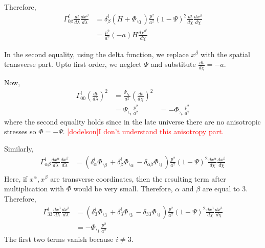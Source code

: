 \documentclass[12pt]{article}
\numberwithin{equation}{section}
\begin{document}
Therefore,
\begin{equation}
\begin{aligned}
\Gamma^{i}_{0\beta} \frac{dt}{d\lambda} \frac{dx^{\beta}}{d\lambda} & = \delta^{i}_\beta (H+\Phi,_{0})  \frac{p^2}{a^2} (1-\Psi)^2 \frac{dt}{d\chi} \frac{dx^\beta}{d\chi} \\
& = \frac{p^2}{a^2} (-a) H \frac{d\chi^{\theta^i}}{d\chi}
\label{eq:rhs1}
\end{aligned}
\end{equation}

In the second equality, using the delta function, we replace $x^\beta$ with the spatial transverse part. Upto first order, we neglect $\Psi$ and substitute $\frac{dt}{d\chi} = -a$.

Now,
\begin{equation}
\begin{aligned}
\Gamma^{i}_{00} (\frac{dt}{d\lambda})^2 & = \frac{\Psi,_{i}}{a^2} (\frac{dt}{d\chi})^2 \\
& = \Psi,_{i} \frac{p^2}{a^2}
& = -\Phi,_{i} \frac{p^2}{a^2}
\label{eq:rhs2}
\end{aligned}
\end{equation}
where the second equality holds since in the late universe there are no anisotropic stresses so $\Phi = - \Psi$. \textcolor{red}{[dodelson]I don't understand this anisotropy part.}


Similarly,
\begin{equation}
\begin{aligned}
\Gamma^{i}_{\alpha \beta} \frac{dx^\alpha}{d\lambda} \frac{dx^{\beta}}{d\lambda} & = (\delta^{i}_{\alpha} \Phi,_{\beta} + \delta ^{i}_{\beta} \Phi, _{\alpha} - \delta_{\alpha \beta}\Phi,_{i} )  \frac{p^2}{a^2} (1-\Psi)^2 \frac{dx^\alpha}{d\chi} \frac{dx^\beta}{d\chi} \\
\end{aligned}
\end{equation}
Here, if $x^\alpha, x^\beta$ are transverse coordinates, then the resulting term after multiplication with $\Phi$ would be very small. Therefore, $\alpha$ and $\beta$ are equal to 3. 
Therefore,
\begin{equation}
\begin{aligned}
\Gamma^{i}_{3 3} \frac{dx^3}{d\lambda} \frac{dx^{3}}{d\lambda} & = (\delta^{i}_{3} \Phi,_{3} + \delta ^{i}_{3} \Phi, _{3} - \delta_{3 3}\Phi,_{i} )  \frac{p^2}{a^2} (1-\Psi)^2 \frac{dx^3}{d\chi} \frac{dx^3}{d\chi} \\
& = - \Phi,_{i} \frac{p^2}{a^2}
\label{eq:rhs3}
\end{aligned}
\end{equation}
The first two terms vanish because $i\neq3$.
\end{document}
